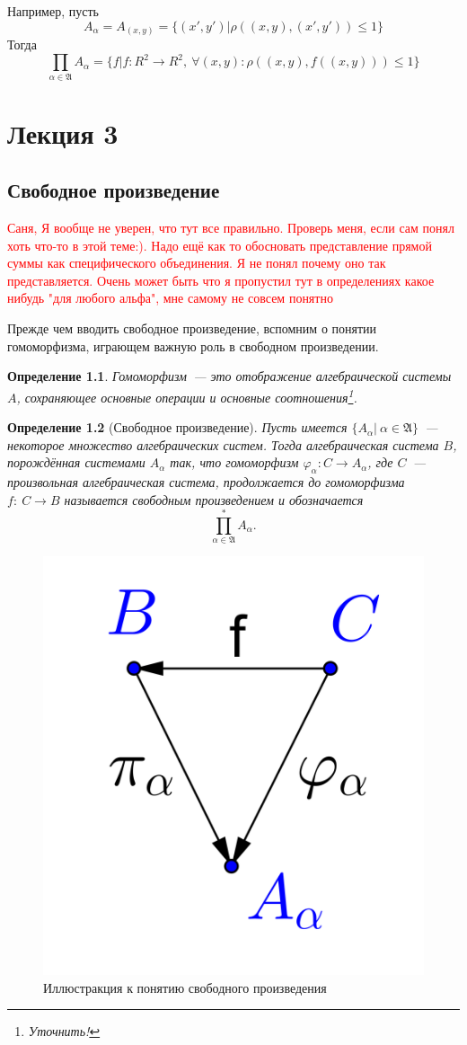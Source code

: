 \documentclass[a4paper, 12pt]{report}
\newtheorem{definition}{Определение}[chapter]
\begin{document}
Например, пусть
\[
A_{\alpha} = A_{(x, y)} = \{(x', y')| \rho((x,y), (x',y')) \leq 1\}
\]
Тогда
\[
\prod_{\alpha \in \mathfrak{A}}A_{\alpha} = \{f| f: R^2 \rightarrow R^2,\ \forall (x,y): \rho((x,y), f((x,y))) \leq 1\}
\]

\chapter{Лекция 3}
\section{Свободное произведение}
\textcolor{red}{Саня, Я вообще не уверен, что тут все правильно. Проверь меня, если сам понял хоть что-то в этой теме:). Надо ещё как то обосновать представление прямой суммы как специфического объединения. Я не понял почему оно так представляется. Очень может быть что я пропустил тут в определениях какое нибудь "для любого альфа", мне самому не совсем понятно}

Прежде чем вводить свободное произведение, вспомним о понятии гомоморфизма, играющем важную роль в свободном произведении.

\begin{definition}
Гомоморфизм~--- это отображение алгебраической системы $A$, сохраняющее основные операции и основные соотношения\footnote{Уточнить!}.
\end{definition}

\begin{definition}[Свободное произведение]
Пусть имеется $\{A_{\alpha}|\ \alpha\in\mathfrak{A}\}$~--- некоторое множество алгебраических систем. Тогда алгебраическая система $B$, порождённая системами $A_{\alpha}$ так, что гомоморфизм $\varphi_{\alpha}: C \rightarrow A_{\alpha}$, где $C$~--- произвольная алгебраическая система, продолжается до гомоморфизма $f:\ C\rightarrow B$ называется свободным произведением и обозначается 
\[
\prod_{\alpha\in\mathfrak{A}}^* A_{\alpha}.
\]
\end{definition}

\begin{figure}[htbp]
\centering
\includegraphics[width=0.3\linewidth]{lect3/FreeProduct.png}
\caption{Иллюстракция к понятию свободного произведения}
\label{fig::free_prod}
\end{figure}
\end{document}
